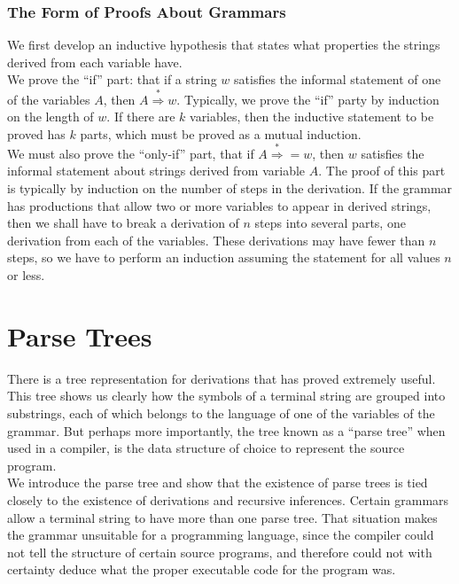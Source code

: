 \documentclass[]{article}
\begin{document}
        \subsubsection*{The Form of Proofs About Grammars}
          We first develop an inductive hypothesis that states what properties
          the strings derived from each variable have. \\
          \indent We prove the ``if'' part: that if a string $w$ satisfies the
          informal statement of one of the variables $A$, then $A \overset{*}
          {\Rightarrow} w$. Typically, we prove the ``if'' party by induction on
          the length of $w$. If there are $k$ variables, then the inductive
          statement to be proved has $k$ parts, which must be proved as a mutual
          induction. \\
          \indent We must also prove the ``only-if'' part, that if $A
          \overset{*}{\Rightarrow} = w$, then $w$ satisfies the informal
          statement about strings derived from variable $A$. The proof of this
          part is typically by induction on the number of steps in the
          derivation. If the grammar has productions that allow two or more
          variables to appear in derived strings, then we shall have to break a
          derivation of $n$ steps into several parts, one derivation from each
          of the variables. These derivations may have fewer than $n$ steps, so
          we have to perform an induction assuming the statement for all values
          $n$ or less.

\section*{Parse Trees}
  There is a tree representation for derivations that has proved extremely
  useful. This tree shows us clearly how the symbols of a terminal string are
  grouped into substrings, each of which belongs to the language of one of the
  variables of the grammar. But perhaps more importantly, the tree known as a
  ``parse tree'' when used in a compiler, is the data structure of choice to
  represent the source program. \\
  \indent We introduce the parse tree and show that the existence of parse trees
  is tied closely to the existence of derivations and recursive inferences.
  Certain grammars allow a terminal string to have more than one parse tree.
  That situation makes the grammar unsuitable for a programming language, since
  the compiler could not tell the structure of certain source programs, and
  therefore could not with certainty deduce what the proper executable code for
  the program was.
\end{document}
